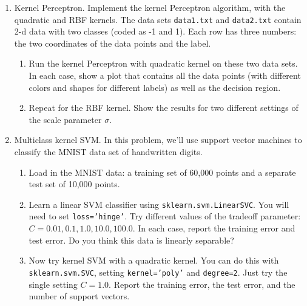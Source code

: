 \documentclass{article}
\begin{document}
\begin{enumerate}
    \item Kernel Perceptron. Implement the kernel Perceptron algorithm, with the quadratic and RBF kernels. The data sets \texttt{data1.txt} and \texttt{data2.txt} contain 2-d data with two classes (coded as -1 and 1). Each row has three numbers: the two coordinates of the data points and the label.
    \begin{enumerate}
        \item Run the kernel Perceptron with quadratic kernel on these two data sets. In each case, show a plot that contains all the data points (with different colors and shapes for different labels) as well as the decision region.
        \item Repeat for the RBF kernel. Show the results for two different settings of the scale parameter $\sigma$.
    \end{enumerate}

    \item Multiclass kernel SVM. In this problem, we'll use support vector machines to classify the MNIST data set of handwritten digits.
    \begin{enumerate}
        \item Load in the MNIST data: a training set of 60,000 points and a separate test set of 10,000 points.
        \item Learn a linear SVM classifier using \texttt{sklearn.svm.LinearSVC}. You will need to set \texttt{loss='hinge'}. Try different values of the tradeoff parameter: $C = 0.01, 0.1, 1.0, 10.0, 100.0$. In each case, report the training error and test error. Do you think this data is linearly separable?
        \item Now try kernel SVM with a quadratic kernel. You can do this with \texttt{sklearn.svm.SVC}, setting \texttt{kernel='poly'} and \texttt{degree=2}. Just try the single setting $C = 1.0$. Report the training error, the test error, and the number of support vectors.
    \end{enumerate}
\end{enumerate}
\end{document}

